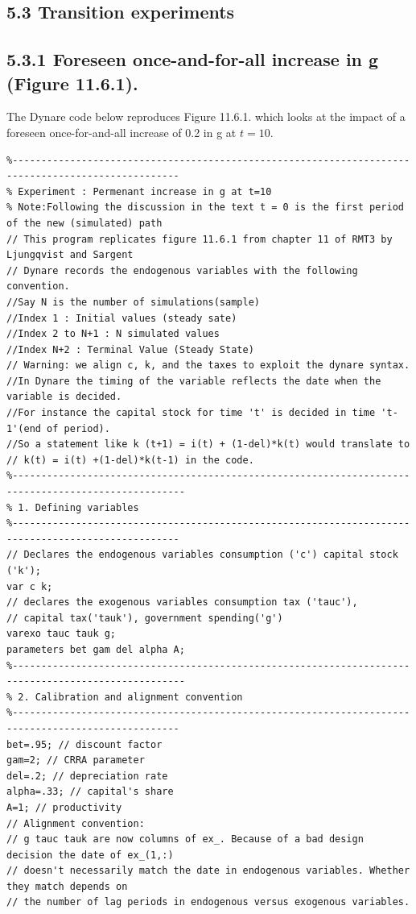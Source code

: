 \documentclass[10pt]{article}
\begin{document}
\subsection*{5.3 Transition experiments}
\subsection*{5.3.1 Foreseen once-and-for-all increase in g (Figure 11.6.1).}
The Dynare code below reproduces Figure 11.6.1. which looks at the impact of a foreseen once-for-and-all increase of 0.2 in g at $t=10$.

\begin{verbatim}
%---------------------------------------------------------------------------------------------------
% Experiment : Permenant increase in g at t=10
% Note:Following the discussion in the text t = 0 is the first period of the new (simulated) path
// This program replicates figure 11.6.1 from chapter 11 of RMT3 by Ljungqvist and Sargent
// Dynare records the endogenous variables with the following convention.
//Say N is the number of simulations(sample)
//Index 1 : Initial values (steady sate)
//Index 2 to N+1 : N simulated values
//Index N+2 : Terminal Value (Steady State)
// Warning: we align c, k, and the taxes to exploit the dynare syntax.
//In Dynare the timing of the variable reflects the date when the variable is decided.
//For instance the capital stock for time 't' is decided in time 't-1'(end of period).
//So a statement like k (t+1) = i(t) + (1-del)*k(t) would translate to
// k(t) = i(t) +(1-del)*k(t-1) in the code.
%----------------------------------------------------------------------------------------------------
% 1. Defining variables
%---------------------------------------------------------------------------------------------------
// Declares the endogenous variables consumption ('c') capital stock ('k');
var c k;
// declares the exogenous variables consumption tax ('tauc'),
// capital tax('tauk'), government spending('g')
varexo tauc tauk g;
parameters bet gam del alpha A;
%----------------------------------------------------------------------------------------------------
% 2. Calibration and alignment convention
%---------------------------------------------------------------------------------------------------
bet=.95; // discount factor
gam=2; // CRRA parameter
del=.2; // depreciation rate
alpha=.33; // capital's share
A=1; // productivity
// Alignment convention:
// g tauc tauk are now columns of ex_. Because of a bad design decision the date of ex_(1,:)
// doesn't necessarily match the date in endogenous variables. Whether they match depends on
// the number of lag periods in endogenous versus exogenous variables.
\end{verbatim}
\end{document}
